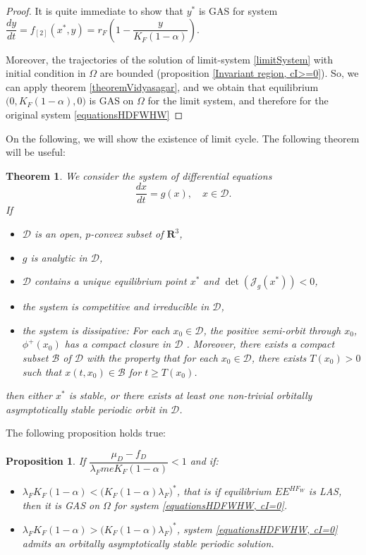 \documentclass{article}
\newcommand{\lfw}{\lambda_{F}}
\newcommand{\lfw}{\lambda_{F}}
\newtheorem{theorem}{Theorem}
\newtheorem{prop}{Proposition}
\begin{document}
\begin{proof}
It is quite immediate to show that $y^*$ is GAS for system $\dfrac{dy}{dt} = f_{[2]}(x^*, y) = r_F \left(1 - \dfrac{y}{K_F(1-\alpha)} \right) $. 

Moreover, the trajectories of the solution of limit-system \eqref{limitSystem} with initial condition in $\Omega$ are bounded (proposition \ref{Invariant region, cI>=0}). So, we can apply theorem \ref{theoremVidyasagar}, and we obtain that equilibrium $\Big(0, K_F(1-\alpha), 0 \Big)$ is GAS on $\Omega$ for the limit system, and therefore for the original system \eqref{equationsHDFWHW}
\end{proof}


On the following, we will show the existence of limit cycle. The following theorem will be useful:

\begin{theorem}\cite{zhu_stable_1994}\label{periodicASOrbit}
We consider the system of differential equations
$$
\dfrac{dx}{dt} = g(x), \quad x \in \mathcal{D}.
$$
If
\begin{itemize}
\item $\mathcal{D}$ is an open, $p$-convex subset of $\mathbf{R}^3$,
\item $g$ is analytic in $\mathcal{D}$,
\item $\mathcal{D}$ contains a unique equilibrium point $x^*$ and $\det(\mathcal{J}_g(x^*)) < 0$,
\item the system is competitive and irreducible in $\mathcal{D}$,
\item the system is dissipative: For each $x_0 \in \mathcal{D}$, the positive semi-orbit through $x_0$, $\phi^+(x_0)$ has a compact closure in $\mathcal{D}$ . Moreover, there exists a compact subset $\mathcal{B}$ of $\mathcal{D}$ with the property that for each $x_0 \in \mathcal{D}$, there exists $T(x_0) > 0$ such that $x(t, x_0) \in \mathcal{B}$ for $t \geq T(x_0)$.
\end{itemize}

then either $x^*$ is stable, or there exists at least one non-trivial orbitally asymptotically stable  periodic orbit in $\mathcal{D}$.
\end{theorem}

The following proposition holds true:

\begin{prop}\label{LimitCycle, cI=0}
If $\dfrac{\mu_D - f_D}{\lfw m e K_F(1-\alpha)} < 1$ and if:
\begin{itemize}
\item $\lfw K_F(1-\alpha) < \Big(K_F(1-\alpha) \lfw \Big)^*$, that is if equilibrium $EE^{HF_W}$ is LAS, then it is GAS on $\Omega$ for system \eqref{equationsHDFWHW, cI=0}.
\item $\lfw K_F(1-\alpha) > \Big(K_F(1-\alpha) \lfw \Big)^*$, system \eqref{equationsHDFWHW, cI=0} admits an orbitally asymptotically stable periodic solution.
\end{itemize}
\end{prop}
\end{document}
